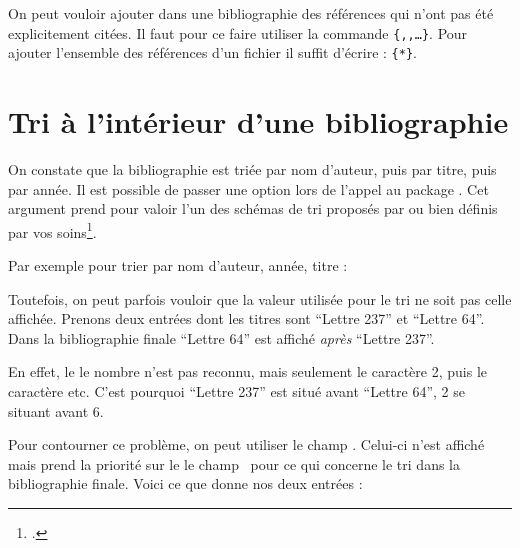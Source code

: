 On peut vouloir ajouter dans une bibliographie des références qui n'ont pas été explicitement citées. Il faut pour ce faire utiliser la commande \verb|{|\verb|,|\verb|,…}|.
Pour ajouter l'ensemble des références d'un fichier  il suffit d'écrire : \verb|{*}|.

\section{Tri à l'intérieur d'une bibliographie}

On constate que la bibliographie est triée par nom d'auteur, puis par titre, puis par année. Il est possible de passer une option  lors de l'appel au package . Cet argument prend pour valoir l'un des schémas de tri proposés par  ou bien définis par vos soins\footcites[Pour les schémas de tri standards voir][]{biblatex_tri}[pour les schémas personnalisés, qui nécessitent l'utilisation de Biber (\cf{} p.~\pageref{biber}), voir][]{biblatex_triperso}.

Par exemple pour trier par nom d'auteur, année, titre :

\begin{latexcode}
\usepackage[sorting=nyt]{biblatex}
\end{latexcode}

Toutefois, on peut parfois vouloir que  la valeur utilisée pour le tri ne soit pas celle affichée. Prenons deux entrées dont les titres sont \enquote{Lettre 237} et \enquote{Lettre 64}. Dans la bibliographie finale
\enquote{Lettre 64} est affiché \emph{après} \enquote{Lettre 237}. 

En effet, le  le nombre  n'est pas reconnu, mais seulement le caractère {2}, puis le caractère  etc. C'est pourquoi \enquote{Lettre 237} est situé avant \enquote{Lettre 64}, 2 se situant avant 6.

Pour contourner ce problème, on peut utiliser le champ . Celui-ci n'est affiché mais prend la priorité sur le le champ  pour ce qui concerne le tri dans la bibliographie finale.  Voici ce que donne nos deux entrées :
\begin{latexcode}
@book{AugustinEpi64,
	Author = {Augustin},
	Sorttitle = {Lettre 064},
	Title = {Lettre 64}}
	
@book{AugustinEpi237,
	Author = {Augustin},
	Sorttitle = {Lettre 237},
	Title = {Lettre 237},
\end{latexcode}

